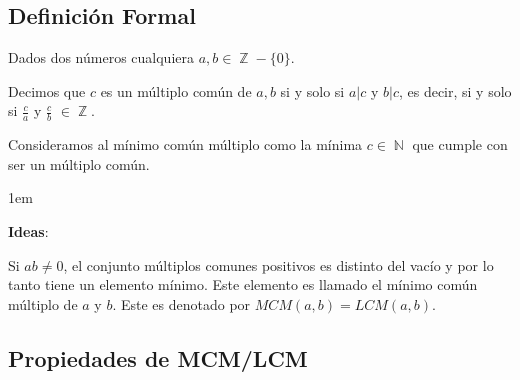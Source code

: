 \documentclass[12pt]{report}                                    %
\newenvironment{SmallIndentation}[1][0.75em]                    %
    {\begin{adjustwidth}{#1}{}\begin{footnotesize}}                 %
    {\end{footnotesize}\end{adjustwidth}}                           %
\DeclareMathOperator \Naturals  {\mathbb{N}}                     %
\DeclareMathOperator \Integers  {\mathbb{Z}}                     %
\begin{document}
        \subsection*{Definición Formal}

            Dados dos números cualquiera $a, b \in \Integers - \{0\}$.

            Decimos que $c$ es un múltiplo común de $a,b$ si y solo si $a|c$ y $b|c$, es decir,
            si y solo si $\frac{c}{a}$ y $\frac{c}{b}$ $\in \Integers$.

            Consideramos al mínimo común múltiplo como la mínima $c \in \Naturals$ que cumple
            con ser un múltiplo común.

            \begin{SmallIndentation}[1em]
                \textbf{Ideas}:

                Si $ab \neq 0$, el conjunto múltiplos comunes positivos es distinto del vacío
                y por lo tanto tiene un elemento mínimo. Este elemento es llamado el mínimo
                común múltiplo de $a$ y $b$. Este es denotado por $MCM(a,b) = LCM(a,b)$.

            \end{SmallIndentation}



        \clearpage
        \subsection{Propiedades de MCM/LCM}
\end{document}
